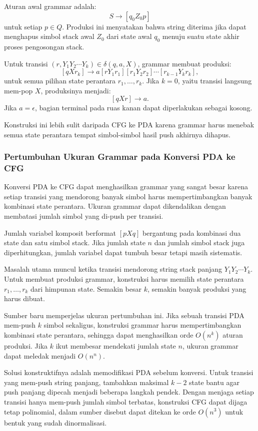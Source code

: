 Aturan awal grammar adalah:
\[
    S \rightarrow [q_0 Z_0 p]
\]
untuk setiap $p\in Q$. Produksi ini menyatakan bahwa string diterima jika dapat menghapus simbol stack awal $Z_0$ dari state awal $q_0$ menuju suatu state akhir proses pengosongan stack.

Untuk transisi $(r,Y_1Y_2\cdots Y_k)\in\delta(q,a,X)$, grammar membuat produksi:
\[
    [qXr_k] \rightarrow a[rY_1r_1][r_1Y_2r_2]\cdots[r_{k-1}Y_kr_k],
\]
untuk semua pilihan state perantara $r_1,\ldots,r_k$. Jika $k=0$, yaitu transisi langsung mem-pop $X$, produksinya menjadi:
\[
    [qXr]\rightarrow a.
\]
Jika $a=\epsilon$, bagian terminal pada ruas kanan dapat diperlakukan sebagai kosong.

Konstruksi ini lebih sulit daripada CFG ke PDA karena grammar harus menebak semua state perantara tempat simbol-simbol hasil push akhirnya dihapus.

\subsubsection{Pertumbuhan Ukuran Grammar pada Konversi PDA ke CFG}

\begin{jawab}
Konversi PDA ke CFG dapat menghasilkan grammar yang sangat besar karena setiap transisi yang mendorong banyak simbol harus mempertimbangkan banyak kombinasi state perantara. Ukuran grammar dapat dikendalikan dengan membatasi jumlah simbol yang di-push per transisi.
\end{jawab}

Jumlah variabel komposit berformat $[pXq]$ bergantung pada kombinasi dua state dan satu simbol stack. Jika jumlah state $n$ dan jumlah simbol stack juga diperhitungkan, jumlah variabel dapat tumbuh besar tetapi masih sistematis.

Masalah utama muncul ketika transisi mendorong string stack panjang $Y_1Y_2\cdots Y_k$. Untuk membuat produksi grammar, konstruksi harus memilih state perantara $r_1,\ldots,r_k$ dari himpunan state. Semakin besar $k$, semakin banyak produksi yang harus dibuat.

Sumber baru memperjelas ukuran pertumbuhan ini. Jika sebuah transisi PDA mem-push $k$ simbol sekaligus, konstruksi grammar harus mempertimbangkan kombinasi state perantara, sehingga dapat menghasilkan orde $O(n^k)$ aturan produksi. Jika $k$ ikut membesar mendekati jumlah state $n$, ukuran grammar dapat meledak menjadi $O(n^n)$.

Solusi konstruktifnya adalah memodifikasi PDA sebelum konversi. Untuk transisi yang mem-push string panjang, tambahkan maksimal $k-2$ state bantu agar push panjang dipecah menjadi beberapa langkah pendek. Dengan menjaga setiap transisi hanya mem-push jumlah simbol terbatas, konstruksi CFG dapat dijaga tetap polinomial, dalam sumber disebut dapat ditekan ke orde $O(n^3)$ untuk bentuk yang sudah dinormalisasi.

